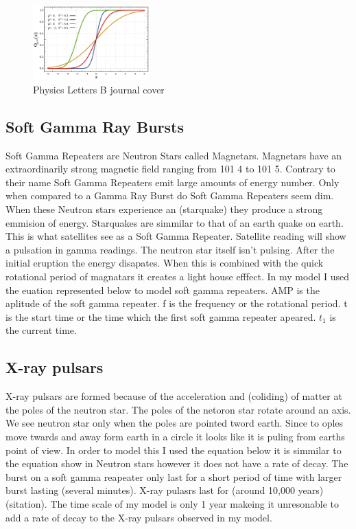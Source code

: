 \documentclass[final,6p,times,twocolumn,authoryear]{elsarticle}
\begin{document}
\begin{figure}
	\centering 
	\includegraphics[width=0.4\textwidth, angle=-0]{800px-dist.png}	
	\caption{Physics Letters B journal cover} 
	\label{fig_mom0}%
\end{figure}

\subsection{Soft Gamma Ray Bursts}

Soft Gamma Repeaters are Neutron Stars called Magnetars. Magnetars have an extraordinarily strong magnetic field ranging from 101 4 to 101 5. Contrary to their name Soft Gamma Repeaters emit large amounts of energy number. Only when compared to a Gamma Ray Burst do Soft Gamma Repeaters seem dim. When these Neutron stars experience an (starquake) they produce a strong emmision of energy. Starquakes are simmilar to that of an earth quake on earth. This is what satellites see as a Soft Gamma Repeater. Satellite reading will show a pulsation in gamma readings. The neutron star itself isn’t pulsing.  After the initial eruption the energy disapates. When this is combined with the quick rotational period of magnatars it creates a light house efffect. In my model I used the euation represented below to model soft gamma repeaters. AMP is the aplitude of the soft gamma repeater. f is the frequency or the rotational period. t is the start time or the time which the first soft gamma repeater apeared. $t_1$ is the current time. 

\subsection{X-ray pulsars}

X-ray pulsars are formed because of the acceleration and (coliding) of matter at the poles of the neutron star. The poles of the netoron star rotate around an axis. We see neutron star only when the poles are pointed tword earth. Since to oples move twards and away form earth in a circle it looks like it is puling from earths point of view. In order to model this I used the equation below it is simmilar to the equation show in Neutron stars however it does not have a rate of decay. The burst on a soft gamma reapeater only last for a short period of time with larger burst lasting (several minutes). X-ray pulasrs last for (around 10,000 years)(sitation). The time scale of my model is only 1 year makeing it unresonable to add a rate of decay to the X-ray pulsars observed in my model. 
\end{document}

